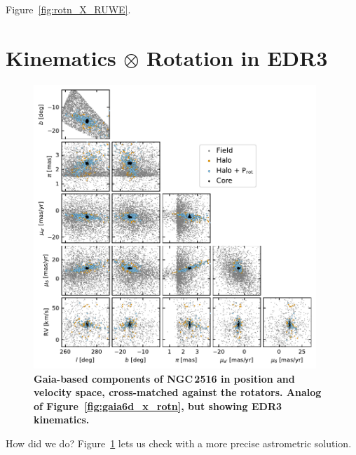\documentclass[12pt,twocolumn,tighten]{aastex63}
\begin{document}
Figure~\ref{fig:rotn_X_RUWE}.


\section{Kinematics $\otimes$ Rotation in EDR3}

\begin{figure}[t]
	\begin{center}
		\leavevmode
		\includegraphics[width=0.95\textwidth]{f7.pdf}
	\end{center}
	\vspace{-0.7cm}
	\caption{ {\bf Gaia-based components of NGC\,2516 in position and
    velocity space, cross-matched against the rotators. Analog of
    Figure~\ref{fig:gaia6d_x_rotn}, but showing EDR3 kinematics.}
		\label{fig:gaia6d_x_rotn_EDR3}
	}
\end{figure}

How did we do?
Figure~\ref{fig:gaia6d_x_rotn_EDR3} lets us check with a more precise
astrometric solution.






\listofchanges

\end{document}
